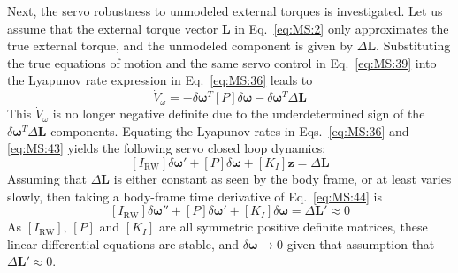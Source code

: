\documentclass[]{BasiliskReportMemo}
\begin{document}
Next, the servo robustness to unmodeled external torques is investigated.  Let us assume that the external torque vector $\bm L$ in Eq.~\eqref{eq:MS:2} only approximates the true external torque, and the unmodeled component is given by $\Delta \bm L$.  Substituting the true equations of motion and the same servo control in Eq.~\eqref{eq:MS:39} into the Lyapunov rate expression in Eq.~\eqref{eq:MS:36} leads to
\begin{equation}
	\label{eq:MS:43}
	\dot V_{\omega} = - \delta\bm\omega ^{T} [P] \delta\bm\omega - \delta\bm\omega ^{T} \Delta \bm L
\end{equation}
This $\dot V_{\omega}$ is no longer negative definite due to the underdetermined sign of the $\delta\bm\omega ^{T} \Delta \bm L$ components.  Equating the Lyapunov rates in Eqs.~\eqref{eq:MS:36} and \eqref{eq:MS:43} yields the following servo closed loop dynamics:
\begin{equation}
	\label{eq:MS:44}
	[I_{\text{RW}}]\delta\bm\omega' + [P]\delta\bm\omega + [K_{I}]\bm z = \Delta\bm L
\end{equation}
Assuming that $\Delta\bm L$ is either constant as seen by the body frame, or at least varies slowly, then taking a body-frame time derivative of Eq.~\eqref{eq:MS:44} is
\begin{equation}
	\label{eq:MS:45}
	[I_{\text{RW}}]\delta\bm\omega'' + [P]\delta\bm\omega' + [K_{I}]\delta \bm \omega = \Delta\bm L' \approx 0 	
\end{equation}
As $[I_{\text{RW}}]$, $[P]$ and $[K_{I}]$ are all symmetric positive definite matrices, these linear differential equations are stable, and $\delta\bm\omega\rightarrow0$ given that assumption that $\Delta\bm L' \approx 0$.  
\end{document}
